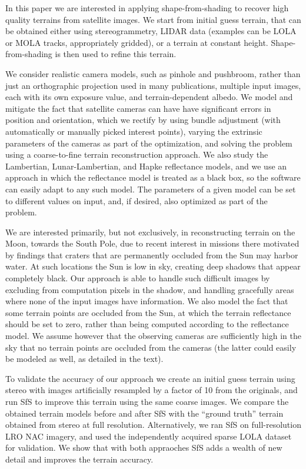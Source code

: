 \documentclass[12pt,oneside]{article}
\begin{document}
In this paper we are interested in applying shape-from-shading to
recover high quality terrains from satellite images. We start from
initial guess terrain, that can be obtained either using
stereogrammetry, LIDAR data (examples can be LOLA or MOLA tracks,
appropriately gridded), or a terrain at constant height. Shape-from-shading
is then used to refine this terrain.

We consider realistic camera models, such as pinhole and pushbroom,
rather than just an orthographic projection used in many publications,
multiple input images, each with its own exposure value, and
terrain-dependent albedo. We model and mitigate the fact that satellite
cameras can have have significant errors in position and orientation,
which we rectify by using bundle adjustment (with automatically
or manually picked interest points), varying the extrinsic parameters of
the cameras as part of the optimization, and solving the problem using
a coarse-to-fine terrain reconstruction approach.  We also study the
Lambertian, Lunar-Lambertian, and Hapke reflectance models, and we use
an approach in which the reflectance model is treated as a black box, so
the software can easily adapt to any such model. The parameters of a given model
can be set to different values on input, and, if desired, also optimized
as part of the problem. 

We are interested primarily, but not exclusively, in reconstructing
terrain on the Moon, towards the South Pole, due to recent interest in missions
there motivated by findings that craters that are permanently occluded
from the Sun may harbor water. At such locations the Sun is low in
sky, creating deep shadows that appear completely black. Our approach is
able to handle such difficult images by excluding from computation
pixels in the shadow, and handling gracefully areas where none of the
input images have information. We also model the fact that some terrain points are
occluded from the Sun, at which the terrain reflectance should be set to zero,
rather than being computed according to the reflectance model. We assume however that
the observing cameras are sufficiently high in the sky that no terrain
points are occluded from the cameras (the latter could easily be modeled
as well, as detailed in the text).

To validate the accuracy of our approach we create an initial guess
terrain using stereo with images
artificially resampled by a factor of 10 from the originals, and run
SfS to improve this terrain using the same coarse images. We compare
the obtained terrain models before and after
SfS with the ``ground truth'' terrain obtained from stereo at full
resolution.  Alternatively, we ran SfS on full-resolution LRO NAC imagery,
and used the independently acquired sparse LOLA dataset for validation.
We show that with both appraoches SfS adds a wealth of new detail and improves
the terrain accuracy. 
\end{document}
